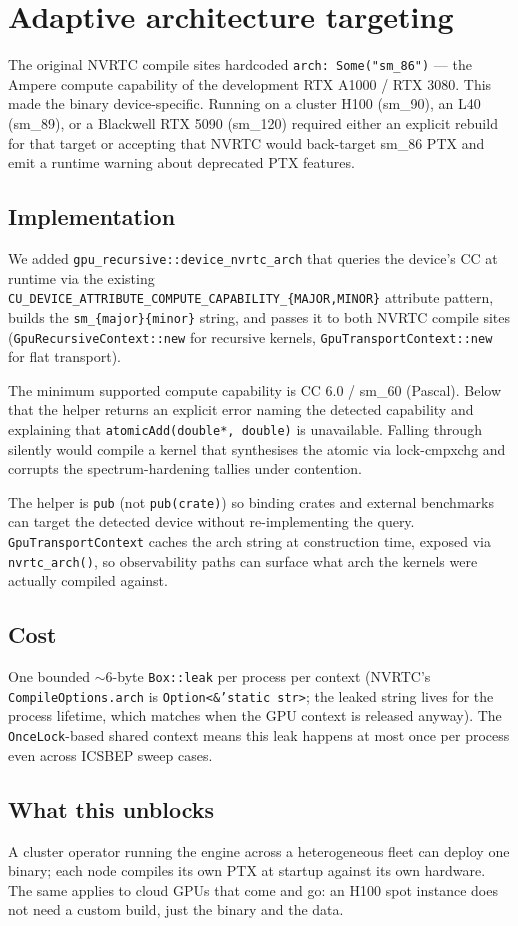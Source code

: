 \section{Adaptive architecture targeting}
\label{sec:adaptive_arch}

The original NVRTC compile sites hardcoded
\texttt{arch: Some("sm\_86")} --- the Ampere compute capability of
the development RTX A1000 / RTX 3080. This made the binary
device-specific. Running on a cluster H100 (sm\_90), an L40
(sm\_89), or a Blackwell RTX 5090 (sm\_120) required either an
explicit rebuild for that target or accepting that NVRTC would
back-target sm\_86 PTX and emit a runtime warning about
deprecated PTX features.

\subsection{Implementation}

We added \texttt{gpu\_recursive::device\_nvrtc\_arch} that queries
the device's CC at runtime via the existing
\texttt{CU\_DEVICE\_ATTRIBUTE\_COMPUTE\_CAPABILITY\_\{MAJOR,MINOR\}}
attribute pattern, builds the \texttt{sm\_\{major\}\{minor\}}
string, and passes it to both NVRTC compile sites
(\texttt{GpuRecursiveContext::new} for recursive kernels,
\texttt{GpuTransportContext::new} for flat transport).

The minimum supported compute capability is CC 6.0 / sm\_60
(Pascal). Below that the helper returns an explicit error
naming the detected capability and explaining that
\texttt{atomicAdd(double*, double)} is unavailable. Falling
through silently would compile a kernel that synthesises the
atomic via lock-cmpxchg and corrupts the spectrum-hardening
tallies under contention.

The helper is \texttt{pub} (not \texttt{pub(crate)}) so binding
crates and external benchmarks can target the detected device
without re-implementing the query. \texttt{GpuTransportContext}
caches the arch string at construction time, exposed via
\texttt{nvrtc\_arch()}, so observability paths can surface what
arch the kernels were actually compiled against.

\subsection{Cost}

One bounded $\sim$6-byte \texttt{Box::leak} per process per
context (NVRTC's \texttt{CompileOptions.arch} is
\texttt{Option<\&'static str>}; the leaked string lives for the
process lifetime, which matches when the GPU context is
released anyway). The \texttt{OnceLock}-based shared context
means this leak happens at most once per process even across
ICSBEP sweep cases.

\subsection{What this unblocks}

A cluster operator running the engine across a heterogeneous
fleet can deploy one binary; each node compiles its own PTX at
startup against its own hardware. The same applies to cloud
GPUs that come and go: an H100 spot instance does not need a
custom build, just the binary and the data.
